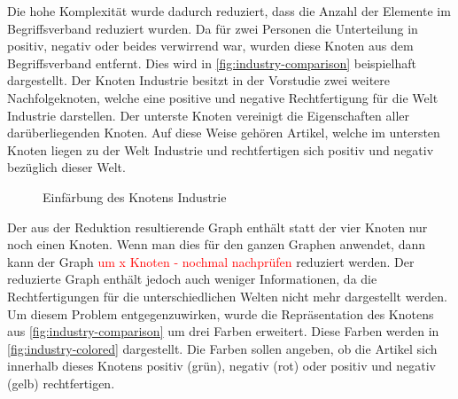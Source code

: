 Die hohe Komplexität wurde dadurch reduziert, dass die Anzahl der Elemente im Begriffsverband reduziert wurden.
Da für zwei Personen die Unterteilung in positiv, negativ oder beides verwirrend war, wurden diese Knoten aus dem Begriffsverband entfernt.
Dies wird in \autoref{fig:industry-comparison} beispielhaft dargestellt.
Der Knoten Industrie besitzt in der Vorstudie zwei weitere Nachfolgeknoten, welche eine positive und negative Rechtfertigung für die Welt Industrie darstellen.
Der unterste Knoten vereinigt die Eigenschaften aller darüberliegenden Knoten.
Auf diese Weise gehören Artikel, welche im untersten Knoten liegen zu der Welt Industrie und rechtfertigen sich positiv und negativ bezüglich dieser Welt.\\

\begin{figure}[!ht]
    \centering
    \caption{Einfärbung des Knotens Industrie}
    \label{fig:industry-colored}
\end{figure}

Der aus der Reduktion resultierende Graph enthält statt der vier Knoten nur noch einen Knoten.
Wenn man dies für den ganzen Graphen anwendet, dann kann der Graph \textcolor{red}{um x Knoten - nochmal nachprüfen} reduziert werden.
Der reduzierte Graph enthält jedoch auch weniger Informationen, da die Rechtfertigungen für die unterschiedlichen Welten nicht mehr dargestellt werden.
Um diesem Problem entgegenzuwirken, wurde die Repräsentation des Knotens aus \autoref{fig:industry-comparison} um drei Farben erweitert.
Diese Farben werden in \autoref{fig:industry-colored} dargestellt.
Die Farben sollen angeben, ob die Artikel sich innerhalb dieses Knotens positiv (grün), negativ (rot) oder positiv und negativ (gelb) rechtfertigen.\\

